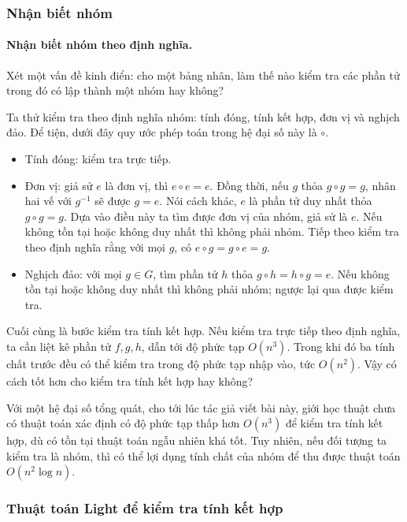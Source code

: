 \documentclass[11pt]{article}
\begin{document}
\subsubsection{Nhận biết nhóm}

\paragraph{Nhận biết nhóm theo định nghĩa.}
Xét một vấn đề kinh điển: cho một bảng nhân, làm thế nào kiểm tra các phần tử
trong đó có lập thành một nhóm hay không?

Ta thử kiểm tra theo định nghĩa nhóm: tính đóng, tính kết hợp, đơn vị và nghịch
đảo. Để tiện, dưới đây quy ước phép toán trong hệ đại số này là \(\circ\).

\begin{itemize}
  \item Tính đóng: kiểm tra trực tiếp.
  \item Đơn vị: giả sử \(e\) là đơn vị, thì \(e\circ e=e\). Đồng thời, nếu
  \(g\) thỏa \(g\circ g=g\), nhân hai vế với \(g^{-1}\) sẽ được \(g=e\). Nói
  cách khác, \(e\) là phần tử duy nhất thỏa \(g\circ g=g\). Dựa vào điều này ta
  tìm được đơn vị của nhóm, giả sử là \(e\). Nếu không tồn tại hoặc không duy
  nhất thì không phải nhóm. Tiếp theo kiểm tra theo định nghĩa rằng với mọi
  \(g\), có \(e\circ g=g\circ e=g\).
  \item Nghịch đảo: với mọi \(g\in G\), tìm phần tử \(h\) thỏa
  \(g\circ h=h\circ g=e\). Nếu không tồn tại hoặc không duy nhất thì không phải
  nhóm; ngược lại qua được kiểm tra.
\end{itemize}

Cuối cùng là bước kiểm tra tính kết hợp. Nếu kiểm tra trực tiếp theo định nghĩa,
ta cần liệt kê phần tử \(f,g,h\), dẫn tới độ phức tạp \(O(n^3)\). Trong khi đó
ba tính chất trước đều có thể kiểm tra trong độ phức tạp nhập vào, tức
\(O(n^2)\). Vậy có cách tốt hơn cho kiểm tra tính kết hợp hay không?

Với một hệ đại số tổng quát, cho tới lúc tác giả viết bài này, giới học thuật
chưa có thuật toán xác định có độ phức tạp thấp hơn \(O(n^3)\) để kiểm tra tính
kết hợp, dù có tồn tại thuật toán ngẫu nhiên khá tốt. Tuy nhiên, nếu đối tượng
ta kiểm tra là nhóm, thì có thể lợi dụng tính chất của nhóm để thu được thuật
toán \(O(n^2\log n)\).

\subsubsection{Thuật toán Light để kiểm tra tính kết hợp}
\end{document}
